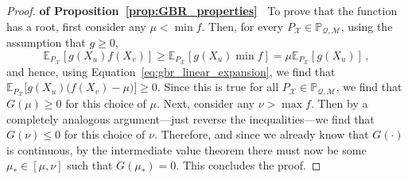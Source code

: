 \documentclass[twoside,11pt]{article}
\newcommand{\states}{\mathcal{X}}
\newcommand{\rateset}{\mathcal{Q}}
\begin{document}
\begin{proof}{\bf of Proposition~\ref{prop:GBR_properties}~}
To prove that the function has a root, first consider any $\mu<\min f$. Then, for every $P_\states\in\mathbb{P}_{\rateset,\mathcal{M}}$, using the assumption that $g\geq 0$,
\begin{equation*}
\mathbb{E}_{P_\states}[g(X_u)f(X_v)] \geq \mathbb{E}_{P_\states}[g(X_u)\min f] = \mu\mathbb{E}_{P_\states}[g(X_u)]\,,
\end{equation*}
and hence, using Equation~\eqref{eq:gbr_linear_expansion}, we find that $\mathbb{E}_{P_\states}\bigl[g(X_u)\bigl(f(X_v)-\mu\bigr)\bigr] \geq 0$. Since this is true for all $P_\states\in \mathbb{P}_{\rateset,\mathcal{M}}$, we find that $G(\mu)\geq 0$ for this choice of $\mu$. Next, consider any $\nu>\max f$. Then by a completely analogous argument---just reverse the inequalities---we find that $G(\nu)\leq 0$ for this choice of $\nu$. Therefore, and since we already know that $G(\cdot)$ is continuous, by the intermediate value theorem there must now be some $\mu_*\in[\mu,\nu]$ such that $G(\mu_*)=0$. This concludes the proof.



\end{proof}
\end{document}
